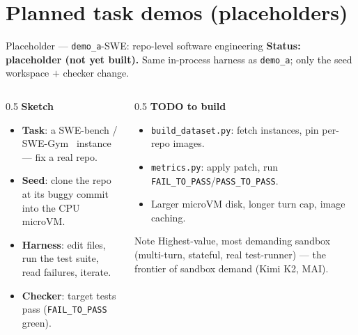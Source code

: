 \documentclass[aspectratio=169]{beamer}
\begin{document}
\section{Planned task demos (placeholders)}

\begin{frame}{Placeholder --- \texttt{demo\_a}-SWE: repo-level software engineering}
  \footnotesize\textbf{Status: placeholder (not yet built).} Same in-process harness as \texttt{demo\_a};
  only the seed workspace $+$ checker change.
  \begin{columns}[T]
    \begin{column}{0.5\textwidth}
      \textbf{Sketch}
      \begin{itemize}\scriptsize\setlength\itemsep{0.1em}
        \item \textbf{Task}: a SWE-bench / SWE-Gym~\cite{swebench,swegym} instance --- fix a real repo.
        \item \textbf{Seed}: clone the repo at its buggy commit into the CPU microVM.
        \item \textbf{Harness}: edit files, run the test suite, read failures, iterate.
        \item \textbf{Checker}: target tests pass (\texttt{FAIL\_TO\_PASS} green).
      \end{itemize}
    \end{column}
    \begin{column}{0.5\textwidth}
      \textbf{TODO to build}
      \begin{itemize}\scriptsize\setlength\itemsep{0.1em}
        \item \texttt{build\_dataset.py}: fetch instances, pin per-repo images.
        \item \texttt{metrics.py}: apply patch, run \texttt{FAIL\_TO\_PASS}/\texttt{PASS\_TO\_PASS}.
        \item Larger microVM disk, longer turn cap, image caching.
      \end{itemize}
      \begin{block}{Note}
        \scriptsize Highest-value, most demanding sandbox (multi-turn, stateful, real test-runner) ---
        the frontier of sandbox demand (Kimi K2, MAI).
      \end{block}
    \end{column}
  \end{columns}
\end{frame}
\end{document}
